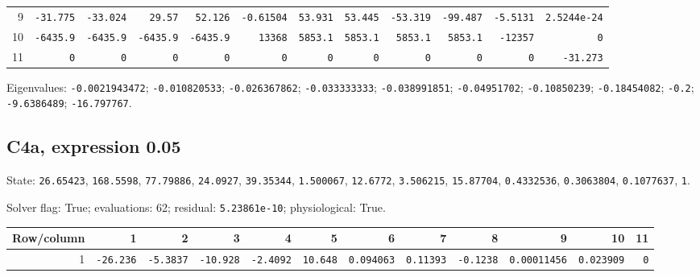 \begin{landscape}
\begin{tabular}{rrrrrrrrrrrr}
9 & \texttt{-31.775} & \texttt{-33.024} & \texttt{29.57} & \texttt{52.126} & \texttt{-0.61504} & \texttt{53.931} & \texttt{53.445} & \texttt{-53.319} & \texttt{-99.487} & \texttt{-5.5131} & \texttt{2.5244e-24} \\

10 & \texttt{-6435.9} & \texttt{-6435.9} & \texttt{-6435.9} & \texttt{-6435.9} & \texttt{13368} & \texttt{5853.1} & \texttt{5853.1} & \texttt{5853.1} & \texttt{5853.1} & \texttt{-12357} & \texttt{0} \\

11 & \texttt{0} & \texttt{0} & \texttt{0} & \texttt{0} & \texttt{0} & \texttt{0} & \texttt{0} & \texttt{0} & \texttt{0} & \texttt{0} & \texttt{-31.273} \\

\bottomrule\end{tabular}\par\endgroup

{\scriptsize Eigenvalues: \texttt{-0.0021943472}; \texttt{-0.010820533}; \texttt{-0.026367862}; \texttt{-0.033333333}; \texttt{-0.038991851}; \texttt{-0.04951702}; \texttt{-0.10850239}; \texttt{-0.18454082}; \texttt{-0.2}; \texttt{-9.6386489}; \texttt{-16.797767}.\par}

\subsection*{C4a, expression 0.05}
{\scriptsize State: \texttt{26.65423}, \texttt{168.5598}, \texttt{77.79886}, \texttt{24.0927}, \texttt{39.35344}, \texttt{1.500067}, \texttt{12.6772}, \texttt{3.506215}, \texttt{15.87704}, \texttt{0.4332536}, \texttt{0.3063804}, \texttt{0.1077637}, \texttt{1}.\par

Solver flag: True; evaluations: 62; residual: \texttt{5.23861e-10}; physiological: True.\par}

\begingroup\scriptsize\setlength{\tabcolsep}{3pt}\centering
\begin{tabular}{rrrrrrrrrrrr}\toprule

Row/column & 1 & 2 & 3 & 4 & 5 & 6 & 7 & 8 & 9 & 10 & 11 \\ \midrule

1 & \texttt{-26.236} & \texttt{-5.3837} & \texttt{-10.928} & \texttt{-2.4092} & \texttt{10.648} & \texttt{0.094063} & \texttt{0.11393} & \texttt{-0.1238} & \texttt{0.00011456} & \texttt{0.023909} & \texttt{0} \\


\end{tabular}
\end{landscape}
